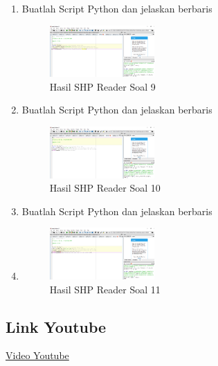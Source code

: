 \begin{enumerate}
    \item Buatlah Script Python dan jelaskan berbaris
    
    \hfill\break
    \begin{figure}[H]
		\includegraphics[width=4cm]{figures/1174031/3/soal9.PNG}
		\centering
		\caption{Hasil SHP Reader Soal 9}
    \end{figure}

    \item Buatlah Script Python dan jelaskan berbaris
    
    \hfill\break
    \begin{figure}[H]
		\includegraphics[width=4cm]{figures/1174031/3/soal10.PNG}
		\centering
		\caption{Hasil SHP Reader Soal 10}
    \end{figure}

    \item Buatlah Script Python dan jelaskan berbaris
    \item 
    \hfill\break
    \begin{figure}[H]
		\includegraphics[width=4cm]{figures/1174031/3/soal11.PNG}
		\centering
		\caption{Hasil SHP Reader Soal 11}
    \end{figure}
\end{enumerate}
\subsection{Link Youtube}
\href{https://youtu.be/h-hU0pquRzI}{Video Youtube}